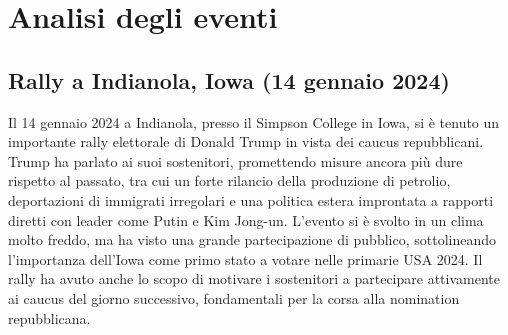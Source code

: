 \chapter{Analisi degli eventi}
\section{Rally a Indianola, Iowa (14 gennaio 2024)}

Il 14 gennaio 2024 a Indianola, presso il Simpson College in Iowa, si è tenuto un importante rally elettorale di Donald Trump in vista dei caucus repubblicani.
Trump ha parlato ai suoi sostenitori, promettendo misure ancora più dure rispetto al passato, tra cui un forte rilancio della produzione di petrolio, deportazioni di immigrati irregolari e una politica estera improntata a rapporti diretti con leader come Putin e Kim Jong-un.
L’evento si è svolto in un clima molto freddo, ma ha visto una grande partecipazione di pubblico, sottolineando l’importanza dell’Iowa come primo stato a votare nelle primarie USA 2024.
Il rally ha avuto anche lo scopo di motivare i sostenitori a partecipare attivamente ai caucus del giorno successivo, fondamentali per la corsa alla nomination repubblicana. \\

